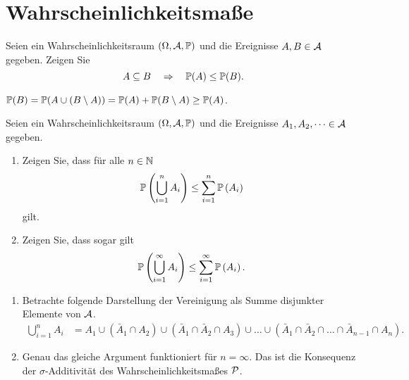 \section{Wahrscheinlichkeitsmaße}

 Seien ein Wahrscheinlichkeitsraum \linebreak
$(\Omega, \mathcal A, \mathbb P)$ und die Ereignisse $A,B \in \mathcal A$ gegeben. Zeigen Sie
\begin{equation*}
A \subseteq B \quad  \Rightarrow \quad \mathbb P(A) \leq \mathbb P(B).
\end{equation*}

\solution $\mathbb P(B) = \mathbb P(A \cup (B \setminus A))= \mathbb P(A) + \mathbb P(B\setminus A) \geq \mathbb P(A)$. 


 Seien ein
Wahrscheinlichkeitsraum $(\Omega, \mathcal A, \mathbb P)$ und die Ereignisse $A_1, A_2, \dots
\in \mathcal A$ gegeben. 
\begin{enumerate}
    \item Zeigen Sie, dass für alle  $n\in \mathbb N$ 
        \begin{equation*}
            \mathbb P \left(  \bigcup \limits_{i=1}^n A_i \right) \leq \sum_{i=1}^{n} \mathbb P\left( A_i \right)
        \end{equation*}
        gilt. 

    \item Zeigen Sie, dass sogar gilt 
        \begin{equation*}
            \mathbb P \left(  \bigcup \limits_{i=1}^\infty A_i \right) \leq \sum_{i=1}^{\infty} \mathbb P\left( A_i \right).
        \end{equation*}
\end{enumerate}

\solution
\begin{enumerate}
    \item Betrachte folgende Darstellung der Vereinigung als Summe disjunkter
        Elemente von $\mathcal A$.
        \begin{align*}
            \bigcup_{i=1}^n A_i &= A_1 \cup (\bar A_1 \cap A_2) \cup 
            (\bar A_1 \cap \bar A_2 \cap A_3) \cup \dots \cup
            (\bar A_1 \cap \bar A_2 \cap \dots \cap \bar A_{n-1} \cap A_n).
        \end{align*}

    \item Genau das gleiche Argument funktioniert für $n=\infty$. Das ist 
        die Konsequenz der $\sigma$-Additivität des Wahrscheinlichkeitsmaßes $\mathcal P$. 
\end{enumerate}


